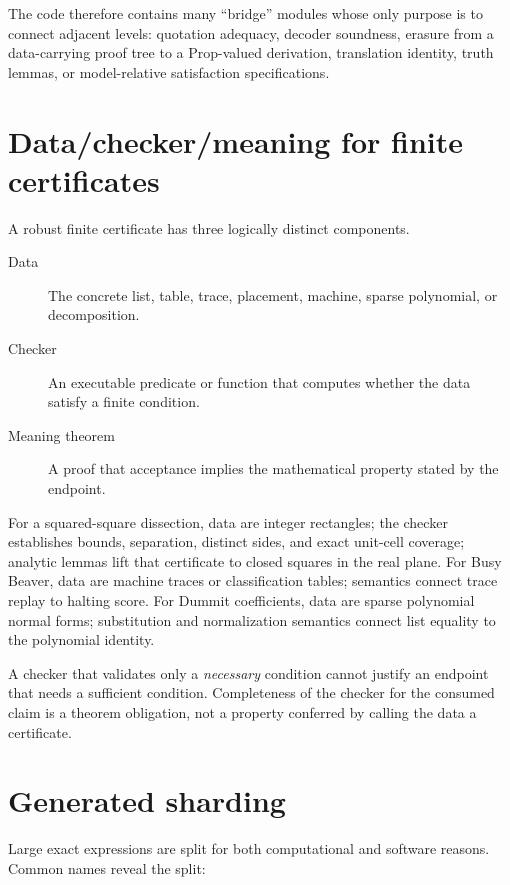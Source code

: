 \documentclass[
  10pt,
  a4paper,
  twoside,
  open=any,
  parskip=half,
  headings=big
]{scrreprt}
\begin{document}
The code therefore contains many ``bridge'' modules whose only purpose is to
connect adjacent levels: quotation adequacy, decoder soundness, erasure from a
data-carrying proof tree to a Prop-valued derivation, translation identity,
truth lemmas, or model-relative satisfaction specifications.

\section{Data/checker/meaning for finite certificates}

A robust finite certificate has three logically distinct components.

\begin{description}
  \item[Data] The concrete list, table, trace, placement, machine, sparse
        polynomial, or decomposition.
  \item[Checker] An executable predicate or function that computes whether the
        data satisfy a finite condition.
  \item[Meaning theorem] A proof that acceptance implies the mathematical
        property stated by the endpoint.
\end{description}

For a squared-square dissection, data are integer rectangles; the checker
establishes bounds, separation, distinct sides, and exact unit-cell coverage;
analytic lemmas lift that certificate to closed squares in the real plane.
For Busy Beaver, data are machine traces or classification tables; semantics
connect trace replay to halting score.  For Dummit coefficients, data are
sparse polynomial normal forms; substitution and normalization semantics
connect list equality to the polynomial identity.

\begin{boundarybox}
A checker that validates only a \emph{necessary} condition cannot justify an
endpoint that needs a sufficient condition.  Completeness of the checker for
the consumed claim is a theorem obligation, not a property conferred by
calling the data a certificate.
\end{boundarybox}

\section{Generated sharding}

Large exact expressions are split for both computational and software reasons.
Common names reveal the split:
\end{document}
